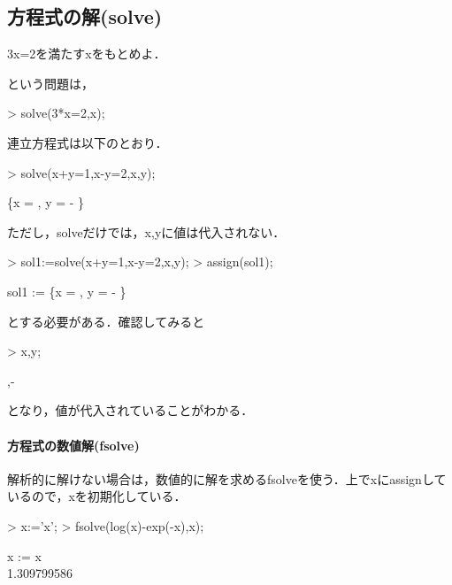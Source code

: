 \subsection{方程式の解(solve)}
\begin{MapleError}
3x=2を満たすxをもとめよ．
\end{MapleError}
という問題は，
\begin{MapleInput}
> solve(3*x=2,x);
\end{MapleInput}
\begin{MapleOutput}
\end{MapleOutput}
連立方程式は以下のとおり．
\begin{MapleInput}
> solve({x+y=1,x-y=2},{x,y});
\end{MapleInput}
\begin{MapleOutput}
\left\{x = , y = - \right\}
\end{MapleOutput}
ただし，solveだけでは，x,yに値は代入されない．
\begin{MapleInput}
> sol1:=solve({x+y=1,x-y=2},{x,y});
> assign(sol1);
\end{MapleInput}
\begin{MapleOutput}
sol1 := \left\{x = , y = - \right\}
\end{MapleOutput}
とする必要がある．確認してみると
\begin{MapleInput}
> x,y;
\end{MapleInput}
\begin{MapleOutput}
,-
\end{MapleOutput}
となり，値が代入されていることがわかる．

\paragraph{方程式の数値解(fsolve)}
解析的に解けない場合は，数値的に解を求めるfsolveを使う．上でxにassignしているので，xを初期化している．
\begin{MapleInput}
> x:='x';
> fsolve(log(x)-exp(-x),x);
\end{MapleInput}
\begin{MapleOutputGather}
x := x \notag \\
1.309799586 \notag
\end{MapleOutputGather}

